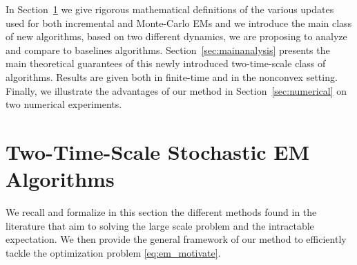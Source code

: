 \documentclass[11pt]{article}
\theoremstyle{t}
\begin{document}
In Section~\ref{sec:tts} we give rigorous mathematical definitions of the various updates used for both incremental and Monte-Carlo EMs and we introduce the main class of new algorithms, based on two different dynamics, we are proposing to analyze and compare to baselines algorithms. Section~\ref{sec:mainanalysis} presents the main theoretical guarantees of this newly introduced two-time-scale class of algorithms. Results are given both in finite-time and in the nonconvex setting.
Finally, we illustrate the advantages of our method in Section~\ref{sec:numerical} on two numerical experiments.



\section{Two-Time-Scale Stochastic EM Algorithms}\label{sec:tts}
We recall and formalize in this section the different methods found in the literature that aim to solving the large scale problem and the intractable expectation. 
We then provide the general framework of our method to efficiently tackle the optimization problem \eqref{eq:em_motivate}.
\end{document}
